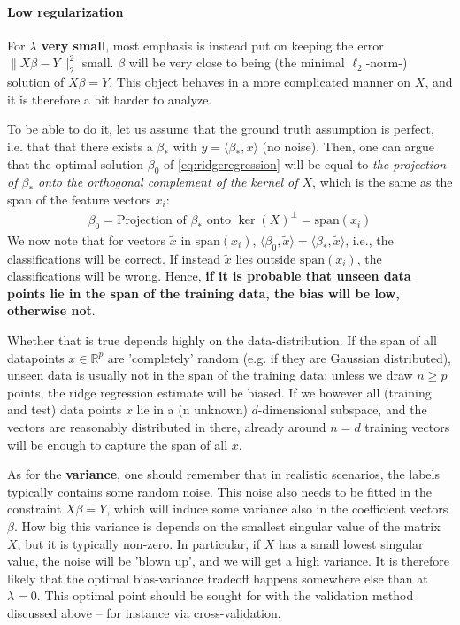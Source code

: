 \documentclass{article}
\newcommand{\sprod}[1]{\langle #1 \rangle}
\newcommand{\R}{\mathbb{R}}
\begin{document}
\paragraph{Low regularization} For \textbf{$\lambda$ very small}, most emphasis is instead put on keeping the error $\|X\beta-Y\|_2^2$ small.   $\beta$ will be very close to being (the minimal $\ell_2$-norm-) solution of $X\beta = Y$. This object behaves in a more complicated manner on $X$, and it is therefore a bit harder to analyze.

To be able to do it, let us assume that the ground truth assumption is perfect, i.e. that that there exists a $\beta_*$ with $y=\sprod{\beta_*,x}$ (no noise). Then, one can argue that the optimal solution $\beta_0$ of \eqref{eq:ridgeregression} will be equal to \emph{the projection of $\beta_*$ onto the orthogonal complement of the kernel of $X$}, which is the same as the span of the feature vectors $x_i$:
\begin{align*}
    \beta_0 = \text{Projection of $\beta_*$ onto $\ker(X)^\perp = \mathrm{span}(x_i)$}
\end{align*}
We now note that 
for vectors $\tilde{x}$ in $\mathrm{span}(x_i)$,  $\sprod{\beta_0,\tilde{x}}= \sprod{\beta_*,\tilde{x}}$, i.e., the classifications will be correct. If instead $\tilde{x}$ lies outside $\mathrm{span}(x_i)$, the classifications will be wrong. Hence, \textbf{if it is probable that unseen data points lie in the span of the training data, the bias will be low, otherwise not}. 

Whether that is true depends highly on the data-distribution. If the span of all datapoints $x \in \R^p$ are 'completely' random (e.g. if they are Gaussian distributed), unseen data is usually not in the span of the training data: unless we  draw $n\geq p$ points, the ridge regression estimate will be biased. If we however all (training and test) data points $x$ lie in a (n unknown) $d$-dimensional subspace, and the vectors are reasonably distributed in there, already around $n=d$ training vectors will be enough to capture the span of all $x$.

As for the \textbf{variance}, one should remember that in realistic scenarios, the labels typically contains some random noise. This noise also needs to be fitted in the constraint $X\beta=Y$, which will induce some variance also in the coefficient vectors $\beta$. How big this variance is depends on the smallest singular value of the matrix $X$, but it is typically non-zero. In particular, if $X$ has a small lowest singular value, the noise will be 'blown up', and we will get a high variance.  It is therefore likely that the optimal bias-variance tradeoff happens somewhere else than at $\lambda=0$. This optimal point should be sought for with the validation method discussed above -- for instance via cross-validation. 
\end{document}
